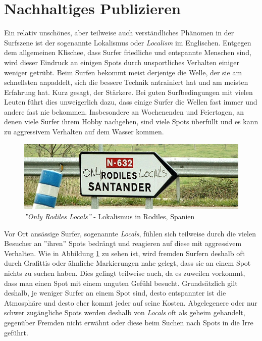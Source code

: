 \section{Nachhaltiges Publizieren}
Ein relativ unschönes, aber teilweise auch verständliches Phänomen in
der Surfszene ist der sogenannte Lokalismus oder \textit{Localism} im
Englischen. Entgegen dem allgemeinen Klischee, dass Surfer friedliche
und entspannte Menschen sind, wird dieser Eindruck an einigen Spots
durch unsportliches Verhalten einiger weniger getrübt. Beim Surfen
bekommt meist derjenige die Welle, der sie am schnellsten anpaddelt,
sich die bessere Technik antrainiert hat und am meisten Erfahrung
hat. Kurz gesagt, der Stärkere. Bei guten Surfbedingungen mit vielen
Leuten führt dies unweigerlich dazu, dass einige Surfer die Wellen
fast immer und andere fast nie bekommen. Insbesondere an Wochenenden
und Feiertagen, an denen viele Surfer ihrem Hobby nachgehen, sind
viele Spots überfüllt und es kann zu aggressivem Verhalten auf dem
Wasser kommen.

\begin{figure}[h]
  \includegraphics[width=\textwidth]{bilder/locals-only}
  \caption{\textit{''Only Rodiles Locals''} - Lokalismus in Rodiles,
    Spanien}
  \label{locals-only}
\end{figure}

Vor Ort ansässige Surfer, sogenannte \textit{Locals}, fühlen sich
teilweise durch die vielen Besucher an ''ihren'' Spots bedrängt und
reagieren auf diese mit aggressivem Verhalten. Wie in Abbildung
\ref{locals-only} zu sehen ist, wird fremden Surfern deshalb oft durch
Grafittis oder ähnliche Markierungen nahe gelegt, dass sie an einem
Spot nichts zu suchen haben. Dies gelingt teilweise auch, da es
zuweilen vorkommt, dass man einen Spot mit einem unguten Gefühl
besucht. Grundsätzlich gilt deshalb, je weniger Surfer an einem Spot
sind, desto entspannter ist die Atmosphäre und desto eher kommt jeder
auf seine Kosten. Abgelegenere oder nur schwer zugängliche Spots
werden deshalb von \textit{Locals} oft als geheim gehandelt, gegenüber
Fremden nicht erwähnt oder diese beim Suchen nach Spots in die Irre
geführt.

